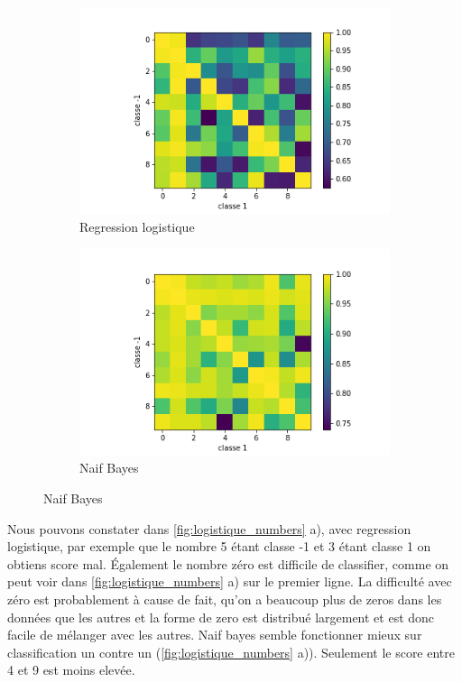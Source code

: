 \documentclass[a4paper,12pt]{article}
\begin{document}
\begin{figure}[h!]
\caption{Les nombres un contre un}
\label{fig:logistique_numbers}
\begin{subfigure}{.5\textwidth}
	\centering
	\includegraphics[width=\linewidth]{images/tme3/logistic_one_vs_one.png}
	\caption{Regression logistique}
\end{subfigure}%
\begin{subfigure}{.5\textwidth}
  \centering
	\includegraphics[width=\linewidth]{images/tme3/nb_one_vs_one.png}
	\caption{Naif Bayes}
\end{subfigure}
\end{figure}

Nous pouvons constater dans \autoref{fig:logistique_numbers} a), avec regression logistique, par exemple que le nombre 5 étant classe -1 et 3 étant classe 1 on obtiens score mal.
Également le nombre zéro est difficile de classifier, comme on peut voir dans \autoref{fig:logistique_numbers} a) sur
le premier ligne. La difficulté avec zéro est probablement à cause de fait, qu'on a beaucoup plus de zeros dans les données que les autres et la forme de zero est distribué largement
et est donc facile de mélanger avec les autres.
Naif bayes semble fonctionner mieux sur classification un contre un (\autoref{fig:logistique_numbers} a)).
Seulement le score entre 4 et 9 est moins elevée.
\end{document}
